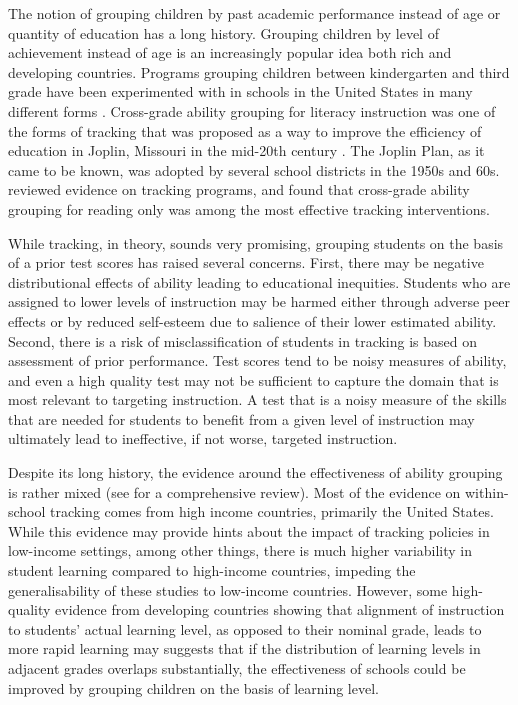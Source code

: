 \documentclass[12pt]{article}
\begin{document}
The notion of grouping children by past academic performance instead of age or quantity of education has a long history. Grouping children by level of achievement instead of age is an increasingly popular idea both rich and developing countries. Programs grouping children between kindergarten and third grade have been experimented with in schools in the United States in many different forms \citep{edweek20191106}. Cross-grade ability grouping for literacy instruction was one of the forms of tracking that was proposed as a way to improve the efficiency of education in Joplin, Missouri in the mid-20th century \citep{floyd:1954}. The Joplin Plan, as it came to be known, was adopted by several school districts in the 1950s and 60s. \cite{slavin:1987} reviewed evidence on tracking programs, and found that cross-grade ability grouping for reading only was among the most effective tracking interventions. 

While tracking, in theory, sounds very promising, grouping students on the basis of a prior test scores has raised several concerns. First, there may be negative distributional effects of ability leading to educational inequities. Students who are assigned to lower levels of instruction may be harmed either through adverse peer effects or by reduced self-esteem \citep{betts:2011} due to salience of their lower estimated ability. Second, there is a risk of misclassification of students in tracking is based on assessment of prior performance. Test scores tend to be noisy measures of ability, and even a high quality test may not be sufficient to capture the domain that is most relevant to targeting instruction. A test that is a noisy measure of the skills that are needed for students to benefit from a given level of instruction may ultimately lead to ineffective, if not worse, targeted instruction. 

Despite its long history, the evidence around the effectiveness of ability grouping is rather mixed (see \cite{betts:2011} for a comprehensive review). Most of the evidence on within-school tracking comes from high income countries, primarily the United States. While this evidence may provide hints about the impact of tracking policies in low-income settings, among other things, there is much higher variability in student learning compared to high-income countries, impeding the generalisability of these studies to low-income countries. However, some high-quality evidence from developing countries showing that alignment of instruction to students' actual learning level, as opposed to their nominal grade, leads to more rapid learning \citep{banerjee/cole/duflo/linden:2007,duflo2011peer,banerjee2017proof,duflo2020experimental,muralidharan2019disrupting} may suggests that if the distribution of learning levels in adjacent grades overlaps substantially, the effectiveness of schools could be improved by grouping children on the basis of learning level. 
\end{document}
